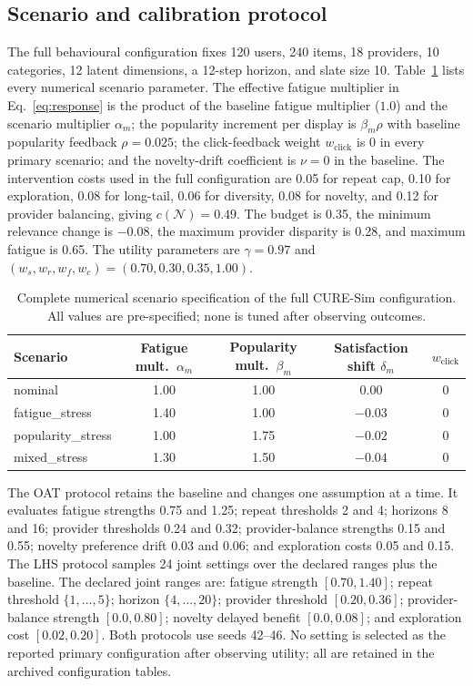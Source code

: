 \documentclass[review]{elsarticle}
\theoremstyle{plain}
\theoremstyle{definition}
\theoremstyle{remark}
\newcommand{\Players}{\mathcal{N}}
\begin{document}
\begin{appendices}
\section{Scenario and calibration protocol}\label{app:protocol}
The full behavioural configuration fixes 120 users, 240 items, 18 providers, 10 categories, 12 latent dimensions, a 12-step horizon, and slate size 10. Table~\ref{tab:scenarios} lists every numerical scenario parameter. The effective fatigue multiplier in Eq.~\eqref{eq:response} is the product of the baseline fatigue multiplier ($1.0$) and the scenario multiplier $\alpha_m$; the popularity increment per display is $\beta_m\rho$ with baseline popularity feedback $\rho=0.025$; the click-feedback weight $w_{\mathrm{click}}$ is $0$ in every primary scenario; and the novelty-drift coefficient is $\nu=0$ in the baseline. The intervention costs used in the full configuration are 0.05 for repeat cap, 0.10 for exploration, 0.08 for long-tail, 0.06 for diversity, 0.08 for novelty, and 0.12 for provider balancing, giving $c(\Players)=0.49$. The budget is 0.35, the minimum relevance change is $-0.08$, the maximum provider disparity is 0.28, and maximum fatigue is 0.65. The utility parameters are $\gamma=0.97$ and $(w_s,w_r,w_f,w_c)=(0.70,0.30,0.35,1.00)$.

\begin{table}[h]
\caption{Complete numerical scenario specification of the full CURE-Sim configuration. All values are pre-specified; none is tuned after observing outcomes.}\label{tab:scenarios}
\centering
\small
\setlength{\tabcolsep}{5pt}
\begin{tabular}{@{}lcccc@{}}
\toprule
Scenario & Fatigue mult.\ $\alpha_m$ & Popularity mult.\ $\beta_m$ & Satisfaction shift $\delta_m$ & $w_{\mathrm{click}}$\\
\midrule
nominal & 1.00 & 1.00 & $0.00$ & 0\\
fatigue\_stress & 1.40 & 1.00 & $-0.03$ & 0\\
popularity\_stress & 1.00 & 1.75 & $-0.02$ & 0\\
mixed\_stress & 1.30 & 1.50 & $-0.04$ & 0\\
\bottomrule
\end{tabular}
\end{table}

The OAT protocol retains the baseline and changes one assumption at a time. It evaluates fatigue strengths 0.75 and 1.25; repeat thresholds 2 and 4; horizons 8 and 16; provider thresholds 0.24 and 0.32; provider-balance strengths 0.15 and 0.55; novelty preference drift 0.03 and 0.06; and exploration costs 0.05 and 0.15. The LHS protocol samples 24 joint settings over the declared ranges plus the baseline. The declared joint ranges are: fatigue strength $[0.70,1.40]$; repeat threshold $\{1,\ldots,5\}$; horizon $\{4,\ldots,20\}$; provider threshold $[0.20,0.36]$; provider-balance strength $[0.0,0.80]$; novelty delayed benefit $[0.0,0.08]$; and exploration cost $[0.02,0.20]$. Both protocols use seeds 42--46. No setting is selected as the reported primary configuration after observing utility; all are retained in the archived configuration tables.


\end{appendices}
\end{document}
